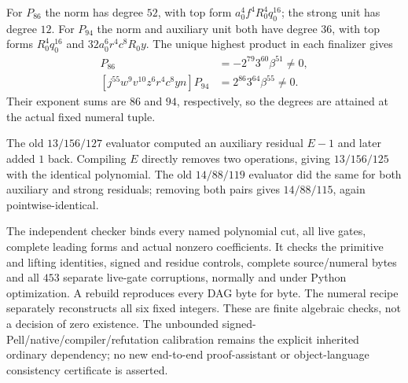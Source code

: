For $P_{86}$ the norm has degree $52$, with top form
$a_0^4f^4R_0^4q_0^{16}$; the strong unit has degree $12$.
For $P_{94}$ the norm and auxiliary unit both have degree $36$, with top
forms $R_0^4q_0^{16}$ and $32a_0^6r^4c^8R_0y$.
The unique highest product in each finalizer gives
\begin{align*}
 [j^{51}w^9v^{10}z^5f^4r^2c^4n]P_{86}
   &=-2^{79}3^{60}\beta^{51}\ne0,\\
 [j^{55}w^9v^{10}z^6r^4c^8yn]P_{94}
   &=2^{86}3^{64}\beta^{55}\ne0.
\end{align*}
Their exponent sums are $86$ and $94$, respectively, so the degrees are
attained at the actual fixed numeral tuple.

The old $13/156/127$ evaluator computed an auxiliary residual $E-1$ and
later added $1$ back. Compiling $E$ directly removes two operations, giving
$13/156/125$ with the identical polynomial. The old $14/88/119$ evaluator
did the same for both auxiliary and strong residuals; removing both pairs
gives $14/88/115$, again pointwise-identical.

The independent checker binds every named polynomial cut, all live gates,
complete leading forms and actual nonzero coefficients. It checks the
primitive and lifting identities, signed and residue controls, complete
source/numeral bytes and all $453$ separate live-gate corruptions, normally
and under Python optimization. A rebuild reproduces every DAG byte for byte.
The numeral recipe separately reconstructs all six fixed integers.
These are finite algebraic checks, not a decision of zero existence. The
unbounded signed-Pell/native/compiler/refutation calibration remains the
explicit inherited ordinary dependency; no new end-to-end proof-assistant or
object-language consistency certificate is asserted.
